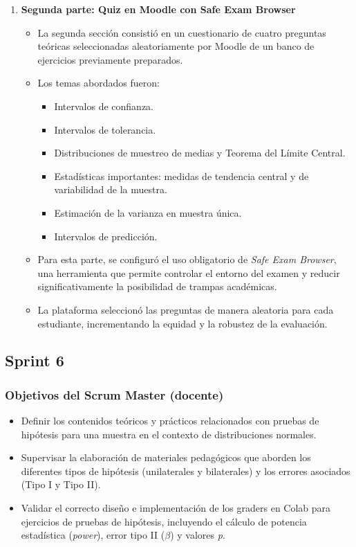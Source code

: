 \documentclass[letter,oneside,12pt,spanish]{report}
\begin{document}
\begin{enumerate}
	\item \textbf{Segunda parte: Quiz en Moodle con Safe Exam Browser}  
	\begin{itemize}
		\item La segunda sección consistió en un cuestionario de cuatro preguntas teóricas seleccionadas aleatoriamente por Moodle de un banco de ejercicios previamente preparados.
		\item Los temas abordados fueron:
		\begin{itemize}
			\item Intervalos de confianza.
			\item Intervalos de tolerancia.
			\item Distribuciones de muestreo de medias y Teorema del Límite Central.
			\item Estadísticas importantes: medidas de tendencia central y de variabilidad de la muestra.
			\item Estimación de la varianza en muestra única.
			\item Intervalos de predicción.
		\end{itemize}
		\item Para esta parte, se configuró el uso obligatorio de \textit{Safe Exam Browser}, una herramienta que permite controlar el entorno del examen y reducir significativamente la posibilidad de trampas académicas.
		\item La plataforma seleccionó las preguntas de manera aleatoria para cada estudiante, incrementando la equidad y la robustez de la evaluación.
	\end{itemize}
\end{enumerate}

\subsection{Sprint 6}

\subsubsection*{Objetivos del Scrum Master (docente)}
\begin{itemize}
	\item Definir los contenidos teóricos y prácticos relacionados con pruebas de hipótesis para una muestra en el contexto de distribuciones normales.
	\item Supervisar la elaboración de materiales pedagógicos que aborden los diferentes tipos de hipótesis (unilaterales y bilaterales) y los errores asociados (Tipo I y Tipo II).
	\item Validar el correcto diseño e implementación de los graders en Colab para ejercicios de pruebas de hipótesis, incluyendo el cálculo de potencia estadística (\textit{power}), error tipo II (\(\beta\)) y valores \textit{p}.
\end{itemize}
\end{document}
